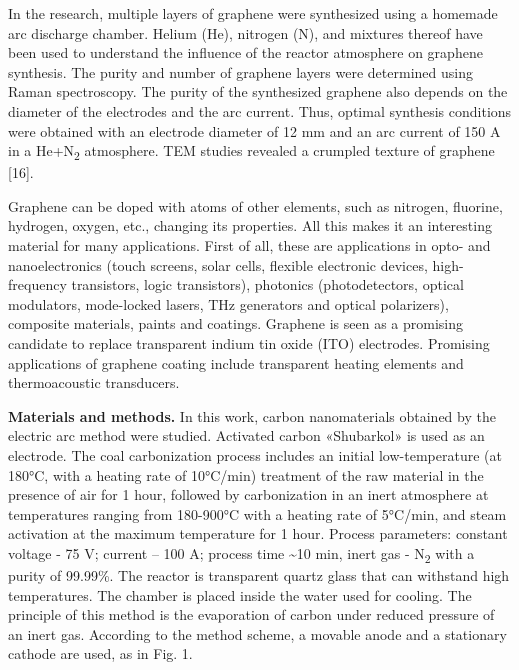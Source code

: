 In the research, multiple layers of graphene were synthesized using a
homemade arc discharge chamber. Helium (He), nitrogen (N), and mixtures
thereof have been used to understand the influence of the reactor
atmosphere on graphene synthesis. The purity and number of graphene
layers were determined using Raman spectroscopy. The purity of the
synthesized graphene also depends on the diameter of the electrodes and
the arc current. Thus, optimal synthesis conditions were obtained with
an electrode diameter of 12 mm and an arc current of 150 A in a
He+N\textsubscript{2} atmosphere. TEM studies revealed a crumpled
texture of graphene {[}16{]}.

Graphene can be doped with atoms of other elements, such as nitrogen,
fluorine, hydrogen, oxygen, etc., changing its properties. All this
makes it an interesting material for many applications. First of all,
these are applications in opto- and nanoelectronics (touch screens,
solar cells, flexible electronic devices, high-frequency transistors,
logic transistors), photonics (photodetectors, optical modulators,
mode-locked lasers, THz generators and optical polarizers), composite
materials, paints and coatings. Graphene is seen as a promising
candidate to replace transparent indium tin oxide (ITO) electrodes.
Promising applications of graphene coating include transparent heating
elements and thermoacoustic transducers.

{\bfseries Materials and methods.} In this work, carbon nanomaterials
obtained by the electric arc method were studied. Activated carbon
«Shubarkol» is used as an electrode. The coal carbonization process
includes an initial low-temperature (at 180°C, with a heating rate of
10°C/min) treatment of the raw material in the presence of air for 1
hour, followed by carbonization in an inert atmosphere at temperatures
ranging from 180-900°C with a heating rate of 5°C/min, and steam
activation at the maximum temperature for 1 hour. Process parameters:
constant voltage - 75 V; current -- \hspace{0pt}\hspace{0pt}100 A;
process time \textasciitilde10 min, inert gas - N\textsubscript{2} with
a purity of 99.99\%. The reactor is transparent quartz glass that can
withstand high temperatures. The chamber is placed inside the water used
for cooling. The principle of this method is the evaporation of carbon
under reduced pressure of an inert gas. According to the method scheme,
a movable anode and a stationary cathode are used, as in Fig. 1.

